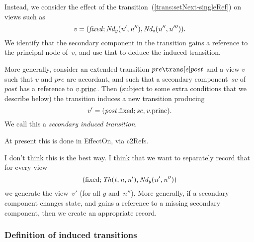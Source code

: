 Instead, we consider the effect of the 
transition~(\ref{trans:setNext-singleRef}) on views such as
\[\mit
v = (fixed; Nd_y(n', n''), Nd_z(n'', n''')).
\]
We identify that the secondary component in the  transition gains a
reference to the principal node of~$v$, and use that to deduce the induced
transition. 

More generally, consider an extended transition $pre \trans[e] post$ and a
view $v$ such that $v$ and $pre$ are accordant, and such that a secondary
component~$sc$ of~$post$ has a reference to $v.\princ$.  Then (subject to some
extra conditions that we describe below) the transition induces a new
transition producing
\[\mit
v' = (post.\fixed; sc, v.\princ).
\]
We call this a \emph{secondary induced transition}. 

\begin{impNote}
At present this is done in EffectOn, via c2Refs. 
\end{impNote}

\begin{improve}
I don't think this is the
best way.  I think that we want to separately record that for every view
\[\mit 
(\fixed; Th(t, n, n'), Nd_y(n', n''))
\]
we generate the view~$v'$ (for all $y$ and~$n''$).  More generally, if a
secondary component changes state, and gains a reference to a missing
secondary component, then we create an appropriate record.
\end{improve}



\subsubsection{Definition of induced transitions}

